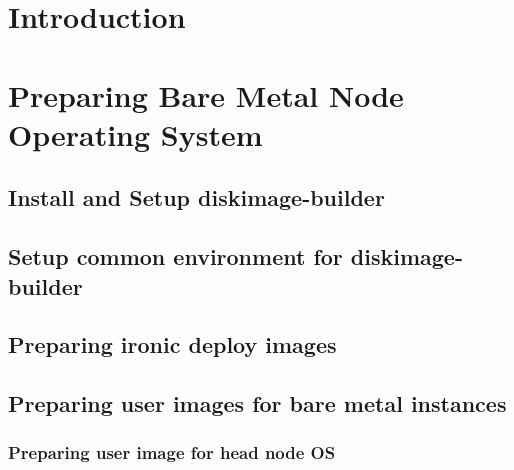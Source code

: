 \documentclass[letterpaper]{article}
\begin{document}
\graphicspath{{common/figures/}}
\thispagestyle{empty}


 

\newpage
\tableofcontents
\newpage


\section{Introduction} \label{sec:introduction}

 






\clearpage
\section{Preparing Bare Metal Node Operating System}\label{sec:baremetalprep}


\subsection{Install and Setup diskimage-builder}\label{sec:dib_install}


\newpage
\subsection{Setup common environment for diskimage-builder}\label{sec:dib_environment}


\newpage
\subsection{Preparing ironic deploy images}\label{sec:ironic_deploy_images}


\newpage
\subsection{Preparing user images for bare metal instances}\label{sec:bare_metal_user_images}


\subsubsection{Preparing user image for head node OS}\label{sec:head_node_images}

\end{document}
